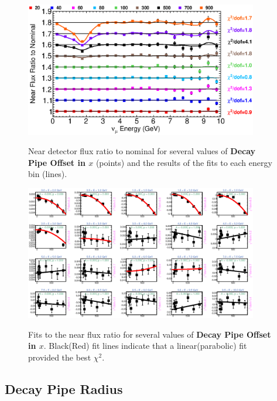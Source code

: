\begin{figure}[ht]
  \begin{center}
    {\includegraphics[width=4.0in]{figures/DecayPipeOffsetX_near_summary.eps}}
  \end{center}
\caption{ Near detector flux ratio to nominal for several values of {\bf Decay Pipe Offset in $x$} (points) and the results of the fits to each energy bin (lines).}
\end{figure}

\begin{figure}[hb]
  \begin{center}
    {\includegraphics[width=4.0in]{figures/DecayPipeOffsetX_near_fits.eps}}
  \end{center}
\caption{ Fits to the near flux ratio for several values of {\bf Decay Pipe Offset in $x$}. Black(Red) fit lines indicate that a linear(parabolic) fit provided the best $\chi^2$. }
\end{figure}

\clearpage
\subsection{Decay Pipe Radius}

